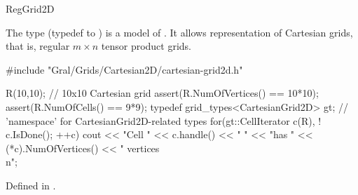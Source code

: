 \begin{Label}{RegGrid2D}
\end{Label}


The type  (typedef to )
is a model of .
It allows representation of Cartesian grids, 
that is, regular $m \times n$ tensor product grids.


\begin{example}
#include "Gral/Grids/Cartesian2D/cartesian-grid2d.h"

 R(10,10);  // 10x10 Cartesian grid
assert(R.NumOfVertices() == 10*10);
assert(R.NumOfCells()    == 9*9);
typedef grid\_types<CartesianGrid2D> gt; // 'namespace' for CartesianGrid2D-related types 
for(gt::CellIterator c(R), ! c.IsDone(); ++c)
  cout << "Cell " << c.handle() << "  "
       << "has "  << (*c).NumOfVertices() << " vertices\\n";
\end{example}


Defined in .

  
\\
\\
\\
\\

